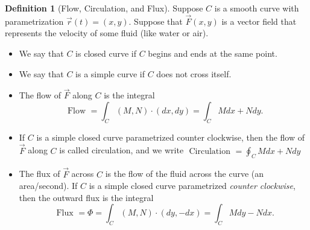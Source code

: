 \documentclass[10pt,]{book}
\theoremstyle{plain}
\theoremstyle{definition}
\newtheorem{definition}[theorem]{Definition}
\theoremstyle{definition}
\theoremstyle{definition}
\theoremstyle{definition}
\theoremstyle{definition}
\numberwithin{equation}{section}
\begin{document}
\begin{definition}[{Flow, Circulation, and Flux}]\label{definition-33}
Suppose \(C\) is a smooth curve with parametrization \(\vec r(t)=(x,y)\). Suppose that \(\vec F(x,y)\) is a vector field that represents the velocity of some fluid (like water or air). \leavevmode%
\begin{itemize}[label=\textbullet]
\item{}We say that \(C\) is closed curve if \(C\) begins and ends at the same point.%
\item{}We say that \(C\) is a simple curve if \(C\) does not cross itself.%
\item{}The flow of \(\vec F\) along \(C\) is the integral%
\begin{equation*}
\text{ Flow }  = \int_C (M,N)\cdot (dx,dy) = \int_C Mdx+Ndy.
\end{equation*}
%
\item{}If \(C\) is a simple closed curve parametrized counter clockwise, then the flow of \(\vec F\) along \(C\) is called circulation, and we write \(\text{ Circulation }  = \oint_C Mdx+Ndy\)%
\item{}The flux of \(\vec F\) across \(C\) is the flow of the fluid across the curve (an area/second). If \(C\) is a simple closed curve parametrized \emph{counter clockwise}, then the outward flux is the integral%
\begin{equation*}
\text{ Flux }  = \Phi = \int_C(M,N)\cdot (dy,-dx) =\int_C Mdy-Ndx .
\end{equation*}
%
\end{itemize}
%
\end{definition}
\end{document}
